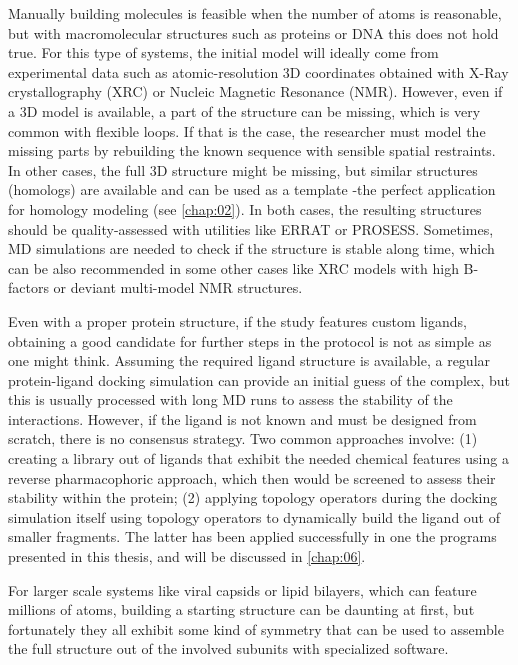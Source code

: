 Manually building molecules is feasible when the number of atoms is reasonable, but with macromolecular structures such as proteins or DNA this does not hold true. For this type of systems, the initial model will ideally come from experimental data such as atomic-resolution 3D coordinates obtained with X-Ray crystallography (XRC) or Nucleic Magnetic Resonance (NMR). However, even if a 3D model is available, a part of the structure can be missing, which is very common with flexible loops. If that is the case, the researcher must model the missing parts by rebuilding the known sequence with sensible spatial restraints. In other cases, the full 3D structure might be missing, but similar structures (homologs) are available and can be used as a template -the perfect application for homology modeling (see \autoref{chap:02}). In both cases, the resulting structures should be quality-assessed with utilities like ERRAT\cite{errat} or PROSESS.\cite{prosess} Sometimes, MD simulations are needed to check if the structure is stable along time, which can be also recommended in some other cases like XRC models with high B-factors or deviant multi-model NMR structures.

Even with a proper protein structure, if the study features custom ligands, obtaining a good candidate for further steps in the protocol is not as simple as one might think. Assuming the required ligand structure is available, a regular protein-ligand docking simulation can provide an initial guess of the complex, but this is usually processed with long MD runs to assess the stability of the interactions. However, if the ligand is not known and must be designed from scratch, there is no consensus strategy. Two common approaches involve: (1) creating a library out of ligands that exhibit the needed chemical features using a reverse pharmacophoric approach, which then would be screened to assess their stability within the protein; (2) applying topology operators during the docking simulation itself using topology operators to dynamically build the ligand out of smaller fragments. The latter has been applied successfully in one the programs presented in this thesis, and will be discussed in \autoref{chap:06}.

For larger scale systems like viral capsids or lipid bilayers, which can feature millions of atoms, building a starting structure can be daunting at first, but fortunately they all exhibit some kind of symmetry that can be used to assemble the full structure out of the involved subunits with specialized software.\cite{bietz2016siena,sym}

